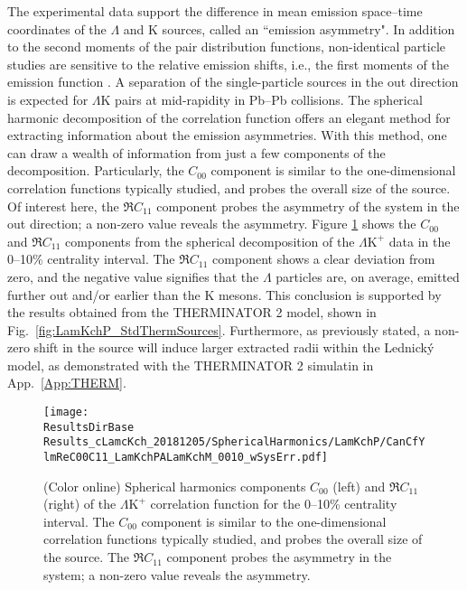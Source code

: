 \documentclass[ALICE,manyauthors]{cernphprep}
\newcommand{\ResultsDirBase}{/home/jesse/Analysis/FemtoAnalysis/Results/}
\newcommand{\Lam}{$\Lambda$\xspace}
\newcommand{\LamK}{$\Lambda$K\xspace}
\newcommand{\LamKchP}{$\Lambda\mathrm{K^{+}}$\xspace}
\begin{document}
The experimental data support the difference in mean emission space--time coordinates of the \Lam and K sources, called an ``emission asymmetry".
In addition to the second moments of the pair distribution functions, non-identical particle studies are sensitive to the relative emission shifts, i.e., the first moments of the emission function \cite{Kisiel:2009eh}.
A separation of the single-particle sources in the out direction is expected for \LamK pairs at mid-rapidity in Pb--Pb collisions.
The spherical harmonic decomposition of the correlation function offers an elegant method for extracting information about the emission asymmetries.
With this method, one can draw a wealth of information from just a few components of the decomposition.
Particularly, the $C_{00}$ component is similar to the one-dimensional correlation functions typically studied, and probes the overall size of the source.
Of interest here, the $\Re C_{11}$ component probes the asymmetry of the system in the out direction; a non-zero value reveals the asymmetry. 
Figure \ref{fig:LamKchP_ReC00C11_0010} shows the $C_{00}$ and $\Re C_{11}$ components from the spherical decomposition of the \LamKchP data in the 0--10\% centrality interval.
The $\Re C_{11}$ component shows a clear deviation from zero, and the negative value signifies that the \Lam particles are, on average, emitted further out and/or earlier than the K mesons.
This conclusion is supported by the results obtained from the THERMINATOR 2 model, shown in Fig.\ \ref{fig:LamKchP_StdThermSources}.
Furthermore, as previously stated, a non-zero shift in the source will induce larger extracted radii within the Lednick\'y model, as demonstrated with the THERMINATOR 2 simulatin in App.\ \ref{App:THERM}.

\begin{figure}[h!]
  \centering
  \texttt{[image: \\ResultsDirBase Results\_cLamcKch\_20181205/SphericalHarmonics/LamKchP/CanCfYlmReC00C11\_LamKchPALamKchM\_0010\_wSysErr.pdf]}
  \caption[\LamKchP $C_{00}$ and $\Re C_{11}$ Spherical Harmonic Components (0--10\%)]
  {
  (Color online) Spherical harmonics components $C_{00}$ (left) and $\Re C_{11}$ (right) of the \LamKchP correlation function for the 0--10\% centrality interval.  
The $C_{00}$ component is similar to the one-dimensional correlation functions typically studied, and probes the overall size of the source.
The $\Re C_{11}$ component probes the asymmetry in the system; a non-zero value reveals the asymmetry.
  }
  \label{fig:LamKchP_ReC00C11_0010}
\end{figure}
\end{document}
